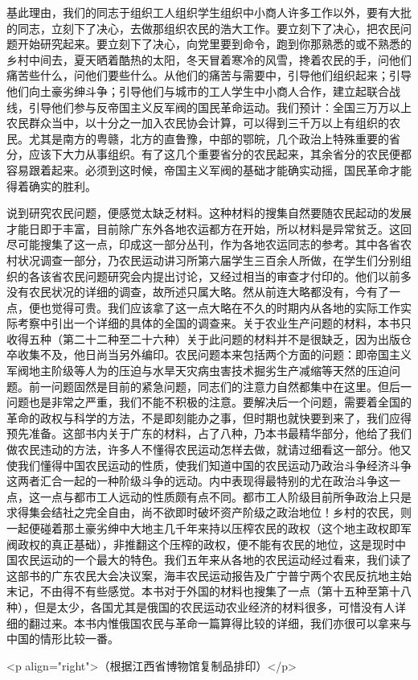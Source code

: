 基此理由，我们的同志于组织工人组织学生组织中小商人许多工作以外，要有大批的同志，立刻下了决心，去做那组织农民的浩大工作。要立刻下了决心，把农民问题开始研究起来。要立刻下了决心，向党里要到命令，跑到你那熟悉的或不熟悉的乡村中间去，夏天晒着酷热的太阳，冬天冒着寒冷的风雪，搀着农民的手，问他们痛苦些什么，问他们要些什么。从他们的痛苦与需要中，引导他们组织起来；引导他们向土豪劣绅斗争；引导他们与城市的工人学生中小商人合作，建立起联合战线，引导他们参与反帝国主义反军阀的国民革命运动。我们预计：全国三万万以上农民群众当中，以十分之一加入农民协会计算，可以得到三千万以上有组织的农民。尤其是南方的粤赣，北方的直鲁豫，中部的鄂皖，几个政治上特殊重要的省分，应该下大力从事组织。有了这几个重要省分的农民起来，其余省分的农民便都容易跟着起来。必须到这时候，帝国主义军阀的基础才能确实动摇，国民革命才能得着确实的胜利。

说到研究农民问题，便感觉太缺乏材料。这种材料的搜集自然要随农民起动的发展才能日即于丰富，目前除广东外各地农运都方在开始，所以材料是异常贫乏。这回尽可能搜集了这一点，印成这一部分丛刊，作为各地农运同志的参考。其中各省农村状况调查一部分，乃农民运动讲习所第六届学生三百余人所做，在学生们分别组织的各该省农民问题研究会内提出讨论，又经过相当的审查才付印的。他们以前多没有农民状况的详细的调查，故所述只属大略。然从前连大略都没有，今有了一点，便也觉得可贵。我们应该拿了这一点大略在不久的时期内从各地的实际工作实际考察中引出一个详细的具体的全国的调查来。关于农业生产问题的材料，本书只收得五种（第二十二种至二十六种）关于此问题的材料并不是很缺乏，因为出版仓卒收集不及，他日尚当另外编印。农民问题本来包括两个方面的问题：即帝国主义军阀地主阶级等人为的压迫与水旱天灾病虫害技术掘劣生产减缩等天然的压迫问题。前一问题固然是目前的紧急问题，同志们的注意力自然都集中在这里。但后一问题也是非常之严重，我们不能不积极的注意。要解决后一个问题，需要着全国的革命的政权与科学的方法，不是即刻能办之事，但时期也就快要到来了，我们应得预先准备。这部书内关于广东的材料，占了八种，乃本书最精华部分，他给了我们做农民违动的方法，许多人不懂得农民运动怎样去做，就请过细看这一部分。他又使我们懂得中国农民运动的性质，使我们知道中国的农民运动乃政治斗争经济斗争这两者汇合一起的一种阶级斗争的远动。内中表现得最特别的尤在政治斗争这一点，这一点与都市工人远动的性质颇有点不同。都市工人阶级目前所争政治上只是求得集会结社之完全自由，尚不欲即时破坏资产阶级之政治地位！乡村的农民，则一起便碰着那土豪劣绅中大地主几千年来持以压榨农民的政权（这个地主政权即军阀政权的真正基础），非推翻这个压榨的政权，便不能有农民的地位，这是现时中国农民运动的一个最大的特色。我们五年来从各地的农民运动经过看来，我们读了这部书的广东农民大会决议案，海丰农民运动报告及广宁普宁两个农民反抗地主始末记，不由得不有些感觉。本书对于外国的材料也搜集了一点（第十五种至第十八种），但是太少，各国尤其是俄国的农民运动农业经济的材料很多，可惜没有人详细的翻过来。本书内惟俄国农民与革命一篇算得比较的详细，我们亦很可以拿来与中国的情形比较一番。

<p align="right">（根据江西省博物馆复制品排印）</p>


